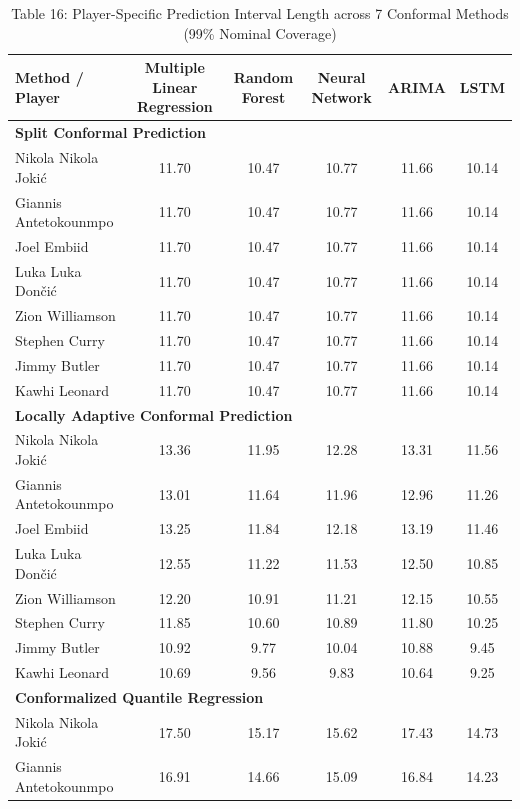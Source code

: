 \documentclass[11pt,a4paper]{article}
\begin{document}
\begin{table}[H]
\centering
\caption{Table 16: Player-Specific Prediction Interval Length across 7 Conformal Methods (99\% Nominal Coverage)}
\label{tab:star_len_99}
\scriptsize
\begin{tabular}{lccccc}
\toprule
Method / Player & Multiple Linear Regression & Random Forest & Neural Network & ARIMA & LSTM \\
\midrule
\multicolumn{6}{l}{\textbf{Split Conformal Prediction}} \\
\midrule
Nikola Nikola Joki\'{c} & 11.70 & 10.47 & 10.77 & 11.66 & 10.14 \\
Giannis Antetokounmpo & 11.70 & 10.47 & 10.77 & 11.66 & 10.14 \\
Joel Embiid & 11.70 & 10.47 & 10.77 & 11.66 & 10.14 \\
Luka Luka Don\v{c}i\'{c} & 11.70 & 10.47 & 10.77 & 11.66 & 10.14 \\
Zion Williamson & 11.70 & 10.47 & 10.77 & 11.66 & 10.14 \\
Stephen Curry & 11.70 & 10.47 & 10.77 & 11.66 & 10.14 \\
Jimmy Butler & 11.70 & 10.47 & 10.77 & 11.66 & 10.14 \\
Kawhi Leonard & 11.70 & 10.47 & 10.77 & 11.66 & 10.14 \\
\midrule
\multicolumn{6}{l}{\textbf{Locally Adaptive Conformal Prediction}} \\
\midrule
Nikola Nikola Joki\'{c} & 13.36 & 11.95 & 12.28 & 13.31 & 11.56 \\
Giannis Antetokounmpo & 13.01 & 11.64 & 11.96 & 12.96 & 11.26 \\
Joel Embiid & 13.25 & 11.84 & 12.18 & 13.19 & 11.46 \\
Luka Luka Don\v{c}i\'{c} & 12.55 & 11.22 & 11.53 & 12.50 & 10.85 \\
Zion Williamson & 12.20 & 10.91 & 11.21 & 12.15 & 10.55 \\
Stephen Curry & 11.85 & 10.60 & 10.89 & 11.80 & 10.25 \\
Jimmy Butler & 10.92 & 9.77 & 10.04 & 10.88 & 9.45 \\
Kawhi Leonard & 10.69 & 9.56 & 9.83 & 10.64 & 9.25 \\
\midrule
\multicolumn{6}{l}{\textbf{Conformalized Quantile Regression}} \\
\midrule
Nikola Nikola Joki\'{c} & 17.50 & 15.17 & 15.62 & 17.43 & 14.73 \\
Giannis Antetokounmpo & 16.91 & 14.66 & 15.09 & 16.84 & 14.23 \\

\end{tabular}
\end{table}
\end{document}
